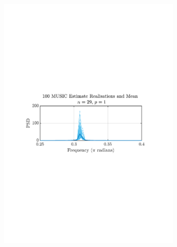 \documentclass[12pt]{article}
\begin{document}
	\begin{figure}[H]
		\centering
		\begin{subfigure}{0.49\textwidth}
			\centering
			\includegraphics[trim={2.2cm 11cm 3.15cm  11.2cm}, clip, width=\textwidth]{../MATLAB/figures/q1_3e_fig01.pdf} 
		\end{subfigure}
		\begin{subfigure}{0.49\textwidth}
			\centering

\end{subfigure}
\end{figure}
\end{document}

